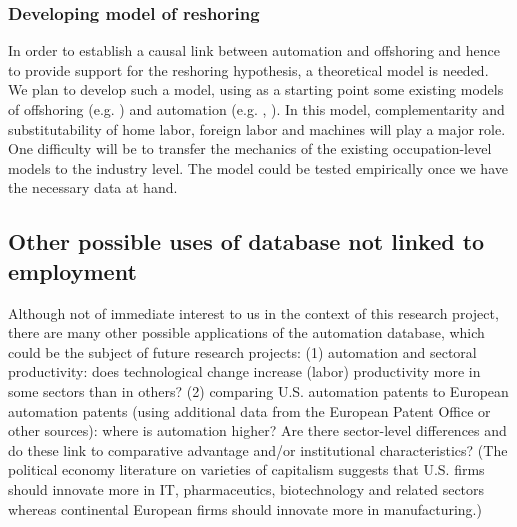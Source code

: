 \documentclass[11pt,a4paper,fleqn]{article}
\begin{document}
\subsubsection*{Developing model of reshoring}

In order to establish a causal link between automation and offshoring and hence to provide support for the reshoring hypothesis, a theoretical model is needed. We plan to develop such a model, using as a starting point some existing models of offshoring (e.g. \cite{GR2008}) and automation (e.g. \cite{ALM2003}, \cite{L2011}). In this model, complementarity and substitutability of home labor, foreign labor and machines will play a major role. One difficulty will be to transfer the mechanics of the existing occupation-level models to the industry level. The model could be tested empirically once we have the necessary data at hand. 

\subsection{Other possible uses of database not linked to employment}
Although not of immediate interest to us in the context of this research project, there are many other possible applications of the automation database, which could be the subject of future research projects: (1) automation and sectoral productivity: does technological change increase (labor) productivity more in some sectors than in others? (2) comparing U.S. automation patents to European automation patents (using additional data from the European Patent Office or other sources): where is automation higher? Are there sector-level differences and do these link to comparative advantage and/or institutional characteristics? (The political economy literature on varieties of capitalism suggests that U.S. firms should innovate more in IT, pharmaceutics, biotechnology and related sectors whereas continental European firms should innovate more in manufacturing.)
\end{document}
